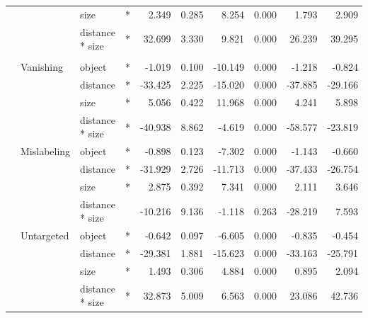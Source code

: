 \begin{longtable}[t]{llllrrrrrr}
\cmidrule{3-10}\nopagebreak
\hspace{1em} &  & size & * & 2.349 & 0.285 & 8.254 & 0.000 & 1.793 & 2.909\\
\cmidrule{3-10}\nopagebreak
\hspace{1em} &  & distance * size & * & 32.699 & 3.330 & 9.821 & 0.000 & 26.239 & 39.295\\
\cmidrule{1-10}\pagebreak[0]
\addlinespace[0.3em]
\multicolumn{10}{l}{\textbf{Cascade R-CNN}}\\
\hspace{1em} & Vanishing & object & * & -1.019 & 0.100 & -10.149 & 0.000 & -1.218 & -0.824\\
\cmidrule{3-10}\nopagebreak
\hspace{1em} &  & distance & * & -33.425 & 2.225 & -15.020 & 0.000 & -37.885 & -29.166\\
\cmidrule{3-10}\nopagebreak
\hspace{1em} &  & size & * & 5.056 & 0.422 & 11.968 & 0.000 & 4.241 & 5.898\\
\cmidrule{3-10}\nopagebreak
\hspace{1em} &  & distance * size & * & -40.938 & 8.862 & -4.619 & 0.000 & -58.577 & -23.819\\
\cmidrule{2-10}\nopagebreak
\hspace{1em} & Mislabeling & object & * & -0.898 & 0.123 & -7.302 & 0.000 & -1.143 & -0.660\\
\cmidrule{3-10}\nopagebreak
\hspace{1em} &  & distance & * & -31.929 & 2.726 & -11.713 & 0.000 & -37.433 & -26.754\\
\cmidrule{3-10}\nopagebreak
\hspace{1em} &  & size & * & 2.875 & 0.392 & 7.341 & 0.000 & 2.111 & 3.646\\
\cmidrule{3-10}\nopagebreak
\hspace{1em} &  & distance * size &  & -10.216 & 9.136 & -1.118 & 0.263 & -28.219 & 7.593\\
\cmidrule{2-10}\nopagebreak
\hspace{1em} & Untargeted & object & * & -0.642 & 0.097 & -6.605 & 0.000 & -0.835 & -0.454\\
\cmidrule{3-10}\nopagebreak
\hspace{1em} &  & distance & * & -29.381 & 1.881 & -15.623 & 0.000 & -33.163 & -25.791\\
\cmidrule{3-10}\nopagebreak
\hspace{1em} &  & size & * & 1.493 & 0.306 & 4.884 & 0.000 & 0.895 & 2.094\\
\cmidrule{3-10}\nopagebreak
\hspace{1em} &  & distance * size & * & 32.873 & 5.009 & 6.563 & 0.000 & 23.086 & 42.736\\
\bottomrule
\end{longtable}
\endgroup{}

